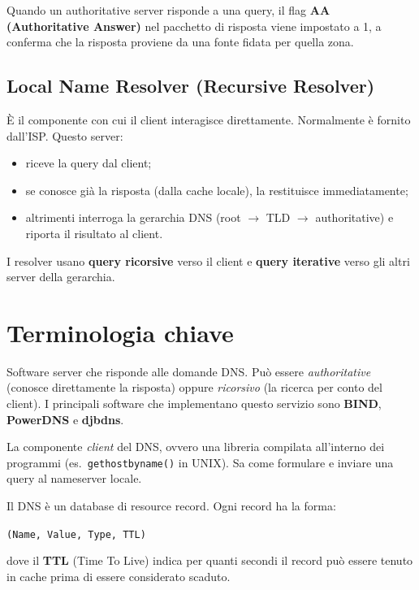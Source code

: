 \documentclass{article}
\begin{document}
Quando un authoritative server risponde a una query, il flag
\textbf{AA (Authoritative Answer)} nel pacchetto di risposta viene impostato
a 1, a conferma che la risposta proviene da una fonte fidata per quella zona.

\subsection*{Local Name Resolver (Recursive Resolver)}

È il componente con cui il client interagisce direttamente. Normalmente è
fornito dall'ISP. Questo server:

\begin{itemize}
    \item riceve la query dal client;
    \item se conosce già la risposta (dalla cache locale), la restituisce
          immediatamente;
    \item altrimenti interroga la gerarchia DNS
          (root $\to$ TLD $\to$ authoritative) e riporta il risultato al client.
\end{itemize}

I resolver usano \textbf{query ricorsive} verso il client e \textbf{query
iterative} verso gli altri server della gerarchia.


\section*{Terminologia chiave}

\begin{description}[leftmargin=2.5cm, style=nextline]
    \item[Nameserver] Software server che risponde alle domande DNS. Può essere
        \emph{authoritative} (conosce direttamente la risposta) oppure
        \emph{ricorsivo} (la ricerca per conto del client). I principali
        software che implementano questo servizio sono \textbf{BIND},
        \textbf{PowerDNS} e \textbf{djbdns}.
    \item[Resolver] La componente \emph{client} del DNS, ovvero una libreria
        compilata all'interno dei programmi (es.\ \texttt{gethostbyname()} in
        UNIX). Sa come formulare e inviare una query al nameserver locale.
    \item[Resource Record (RR)] Il DNS è un database di resource record.
        Ogni record ha la forma:
        \begin{center}
            \texttt{(Name, Value, Type, TTL)}
        \end{center}
        dove il \textbf{TTL} (Time To Live) indica per quanti secondi il
        record può essere tenuto in cache prima di essere considerato scaduto.
\end{description}
\end{document}
